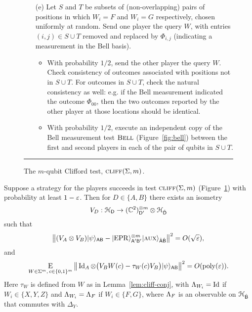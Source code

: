 \begin{figure}[H]
\begin{itemize}
\begin{enumerate}
\item[(e)] Let $S$ and $T$ be subsets of (non-overlapping) pairs of positions in which $W_i=F$ and $W_i=G$ respectively, chosen uniformly at random. Send one player the query $W$, with entries $(i,j) \in S\cup T$ removed and replaced by $\Phi_{i,j}$ (indicating a measurement in the Bell basis). 
\begin{itemize}
\item With probability $1/2$, send the other player the query $W$. Check consistency of outcomes associated with positions not in $S\cup T$. For outcomes in $S\cup T$, check the natural consistency as well: e.g. if the Bell measurement indicated the outcome $\Phi_{00}$, then the two outcomes reported by the other player at those locations should be identical. 
\item With probability $1/2$, execute an independent copy of the Bell measurement test $\textsc{Bell}$ (Figure~\ref{fig:bell}) between the first and second players in each of the pair of qubits in $S\cup T$. 
\end{itemize}
\end{enumerate}
\end{itemize}
\rule[2ex]{\textwidth}{0.5pt}\vspace{-.5cm}
\caption{The $m$-qubit Clifford test, $\textsc{cliff}(\Sigma,m)$.}
\label{fig:clifford-test-3}
\end{figure}


\begin{theorem}\label{thm:clifford-ntest}
Suppose a strategy for the players succeeds in test $\textsc{cliff}(\Sigma,m)$ (Figure~\ref{fig:clifford-test-3}) with probability at least $1-\varepsilon$. Then  for $D\in\{A,B\}$ there exists an isometry 
$$V_D: \mathcal{H}_{\textsf{D}} \to (\mathbb{C}^2)^{\otimes m}_{{\textsf{D}}'} \otimes {\mathcal{H}}_{\hat{{\textsf{D}}}}$$
such that 
\begin{equation}\label{eq:psi-epr}
\big\| (V_A \otimes V_B) |\psi\rangle_{{\textsf{AB}}} - |{\rm EPR}\rangle_{{\textsf{A}}'{\textsf{B}}'}^{\otimes m} |\textsc {aux}\rangle_{\hat{{\textsf{A}}}\hat{{\textsf{B}}}} \big\|^2 = O(\sqrt{\varepsilon}),
\end{equation}
and %
\begin{equation}\label{eq:clifford-ntest-close}
\mathop{\textsc{E}}_{W\in\Sigma^m,\,c\in\{0,1\}^m} \big\| \mathop{\rm Id}\nolimits_A \otimes \big( V_B W(c) - \tau_{W}(c) V_B\big)   |\psi\rangle_{{\textsf{AB}}} \big\|^2 = O(\operatorname{poly}(\varepsilon)).
\end{equation}
Here $\tau_W$ is defined from $W$ as in Lemma~\ref{lem:cliff-conj}, with $\Lambda_{W_i} = \mathop{\rm Id}\nolimits$ if $W_i\in \{X,Y,Z\}$ and $\Lambda_{W_i} = \Lambda_F$ if $W_i\in\{F,G\}$, where $\Lambda_F$ is an  observable on ${\mathcal{H}}_{\hat{{\textsf{B}}}}$ that commutes with $\Delta_Y$. 
\end{theorem}

